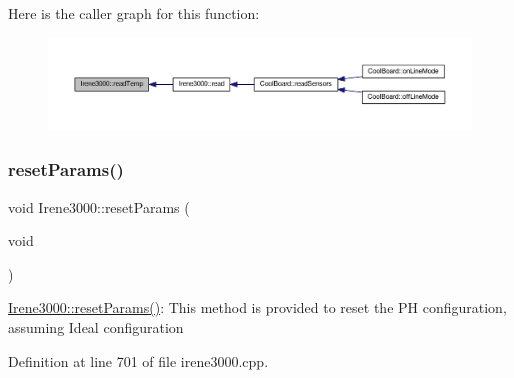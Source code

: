 Here is the caller graph for this function\+:\nopagebreak
\begin{figure}[H]
\begin{center}
\leavevmode
\includegraphics[width=350pt]{d6/d03/class_irene3000_a80bc6dfea106dc3bc54fa20204d4d5dc_icgraph}
\end{center}
\end{figure}
\mbox{\label{class_irene3000_a43b0e44f8d211413ff4e3a0c654205ff}} 
\subsubsection{\texorpdfstring{reset\+Params()}{resetParams()}}
{\footnotesize\ttfamily void Irene3000\+::reset\+Params (\begin{DoxyParamCaption}\item[{void}]{ }\end{DoxyParamCaption})}

\hyperlink{class_irene3000_a43b0e44f8d211413ff4e3a0c654205ff}{Irene3000\+::reset\+Params()}\+: This method is provided to reset the PH configuration, assuming Ideal configuration 

Definition at line 701 of file irene3000.\+cpp.



